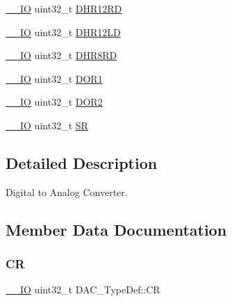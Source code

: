 \begin{DoxyCompactItemize}
\item 
\mbox{\hyperlink{core__sc300_8h_aec43007d9998a0a0e01faede4133d6be}{\+\_\+\+\_\+\+IO}} uint32\+\_\+t \mbox{\hyperlink{struct_d_a_c___type_def_affa5cc9fe0cc9eb594d703bdc9d9abd9}{D\+H\+R12\+RD}}
\item 
\mbox{\hyperlink{core__sc300_8h_aec43007d9998a0a0e01faede4133d6be}{\+\_\+\+\_\+\+IO}} uint32\+\_\+t \mbox{\hyperlink{struct_d_a_c___type_def_aea4d055e3697999b44cdcf2702d79d40}{D\+H\+R12\+LD}}
\item 
\mbox{\hyperlink{core__sc300_8h_aec43007d9998a0a0e01faede4133d6be}{\+\_\+\+\_\+\+IO}} uint32\+\_\+t \mbox{\hyperlink{struct_d_a_c___type_def_a03f8d95bbf0ce3a53cb79506d5bf995a}{D\+H\+R8\+RD}}
\item 
\mbox{\hyperlink{core__sc300_8h_aec43007d9998a0a0e01faede4133d6be}{\+\_\+\+\_\+\+IO}} uint32\+\_\+t \mbox{\hyperlink{struct_d_a_c___type_def_a50b4f0b0d2a376f729c8d7acf47864c3}{D\+O\+R1}}
\item 
\mbox{\hyperlink{core__sc300_8h_aec43007d9998a0a0e01faede4133d6be}{\+\_\+\+\_\+\+IO}} uint32\+\_\+t \mbox{\hyperlink{struct_d_a_c___type_def_a1bde8391647d6422b39ab5ba4f13848b}{D\+O\+R2}}
\item 
\mbox{\hyperlink{core__sc300_8h_aec43007d9998a0a0e01faede4133d6be}{\+\_\+\+\_\+\+IO}} uint32\+\_\+t \mbox{\hyperlink{struct_d_a_c___type_def_a1d3fd83d6ed8b2d90b471db4509b0e70}{SR}}
\end{DoxyCompactItemize}


\subsection{Detailed Description}
Digital to Analog Converter. 

\subsection{Member Data Documentation}
\mbox{\label{struct_d_a_c___type_def_a394324f0b573837ca15a87127b2a37ea}} 
\subsubsection{\texorpdfstring{CR}{CR}}
{\footnotesize\ttfamily \mbox{\hyperlink{core__sc300_8h_aec43007d9998a0a0e01faede4133d6be}{\+\_\+\+\_\+\+IO}} uint32\+\_\+t D\+A\+C\+\_\+\+Type\+Def\+::\+CR}


